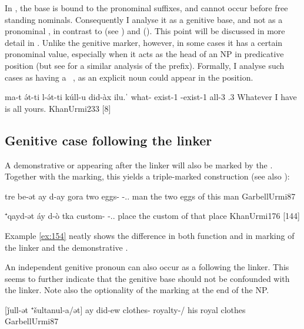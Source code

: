 In \JUrm, the  base is bound to the pronominal suffixes, and cannot occur before free standing nominals. Consequently I analyse it as  a genitive base, and not as a pronominal \lnk*, in contrast to \JZax (see ) and \Qar (). This point will be discussed in more detail in . Unlike the  genitive marker, however, in some cases it has a certain pronominal value, especially when it acts as the head of an NP in predicative position (but see  for a similar analysis of the  prefix). Formally, I analyse such cases as having a \zero\ \prim, as an explicit noun could appear in the \prim position. 

{ma-t ə́t-ti l-ə́t-ti kúll-u \zero{} did-àx \cb{}ilu.ˈ}
{what-\cst{} exist-1\sg{}  \neg-exist-1\sg{} all-3\masc{} \zero{} \fem{} \cb{}\cop.3\masc}
{Whatever I have is all yours.}
{KhanUrmi}{233 {[8]}}



\subsection{Genitive case following the linker } \label{ss:JUrm_lnk_gen}

A demonstrative or  appearing after the linker will also be marked by the  . Together with the \cst* marking, this yields a triple-marked construction (see also ):

{tre be-ət ay d-ay gora}
{two eggs-\cst{} \lnk{} \gen-\dem.\near.\sg{} man}
{the two eggs of this man}
{GarbellUrmi}{87}

{⁺qayd-ət áy d-ò\cb{} tka}
	{custom-\cst{} \lnk{} \gen-\dem.\far.\sg\cb{} place}
{the custom of that place}
{KhanUrmi}{176 {[144]}}

Example \vref{ex:154} neatly shows the difference in both function and in marking of the linker   and the demonstrative . 

An independent genitive pronoun can also occur as a \secn following the linker. This seems to further indicate that the genitive base  should not be confounded with the linker. Note also the optionality of the \cst* marking at the end of the \prim NP.

{[ǰull-ət ⁺šultanul-a/ət] ay did-ew}
{clothes-\cst{} royalty-\free/\cst{} \lnk{} \masc}
{his royal clothes}
{GarbellUrmi}{87}

